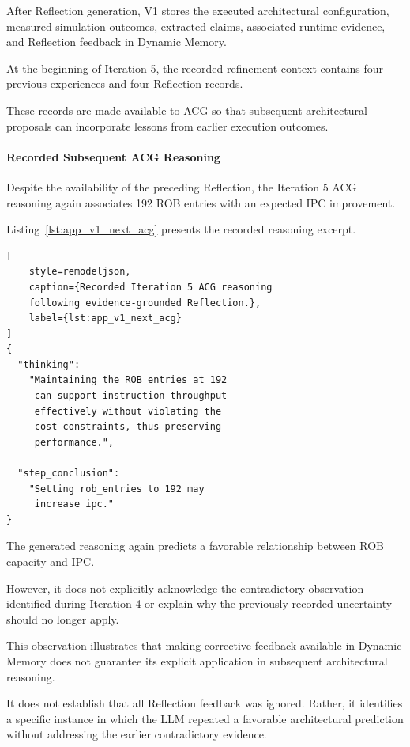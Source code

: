 After Reflection generation, V1 stores the
executed architectural configuration,
measured simulation outcomes, extracted
claims, associated runtime evidence, and
Reflection feedback in Dynamic Memory.

At the beginning of Iteration 5, the
recorded refinement context contains four
previous experiences and four Reflection
records.

These records are made available to ACG
so that subsequent architectural proposals
can incorporate lessons from earlier
execution outcomes.

\paragraph{Recorded Subsequent ACG Reasoning}

Despite the availability of the preceding
Reflection, the Iteration 5 ACG reasoning
again associates 192 ROB entries with
an expected IPC improvement.

Listing~\ref{lst:app_v1_next_acg}
presents the recorded reasoning excerpt.

\begin{lstlisting}[
    style=remodeljson,
    caption={Recorded Iteration 5 ACG reasoning
    following evidence-grounded Reflection.},
    label={lst:app_v1_next_acg}
]
{
  "thinking":
    "Maintaining the ROB entries at 192
     can support instruction throughput
     effectively without violating the
     cost constraints, thus preserving
     performance.",

  "step_conclusion":
    "Setting rob_entries to 192 may
     increase ipc."
}
\end{lstlisting}

The generated reasoning again predicts
a favorable relationship between ROB
capacity and IPC.

However, it does not explicitly acknowledge
the contradictory observation identified
during Iteration 4 or explain why the
previously recorded uncertainty should
no longer apply.

This observation illustrates that making
corrective feedback available in Dynamic
Memory does not guarantee its explicit
application in subsequent architectural
reasoning.

It does not establish that all Reflection
feedback was ignored. Rather, it identifies
a specific instance in which the LLM
repeated a favorable architectural
prediction without addressing the earlier
contradictory evidence.


